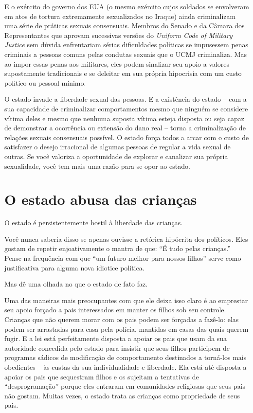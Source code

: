 E o exército do governo dos EUA (o mesmo exército cujos soldados se envolveram em atos de tortura extremamente sexualizados no Iraque) ainda criminalizam uma série de práticas sexuais consensuais. Membros do Senado e da Câmara dos Representantes que aprovam sucessivas versões do \emph{Uniform Code of Military Justice} sem dúvida enfrentariam sérias dificuldades políticas se impusessem penas criminais a pessoas comuns pelas condutas sexuais que o UCMJ criminaliza. Mas ao impor essas penas aos militares, eles podem sinalizar seu apoio a valores supostamente tradicionais e se deleitar em sua própria hipocrisia com um custo político ou pessoal mínimo.

O estado invade a liberdade sexual das pessoas. E a existência do estado -- com a sua capacidade de criminalizar comportamentos mesmo que ninguém se considere vítima deles e mesmo que nenhuma suposta vítima esteja disposta ou seja capaz de demonstrar a ocorrência ou extensão do dano real -- torna a criminalização de relações sexuais consensuais possível. O estado força todos a arcar com o custo de satisfazer o desejo irracional de algumas pessoas de regular a vida sexual de outras. Se você valoriza a oportunidade de explorar e canalizar sua própria sexualidade, você tem mais uma razão para se opor ao estado.

\section{O estado abusa das crianças}

O estado é persistentemente hostil à liberdade das crianças.

Você nunca saberia disso se apenas ouvisse a retórica hipócrita dos políticos. Eles gostam de repetir enjoativamente o mantra de que: ``É tudo pelas crianças.'' Pense na frequência com que ``um futuro melhor para nossos filhos'' serve como justificativa para alguma nova idiotice política.

Mas dê uma olhada no que o estado de fato faz.

Uma das maneiras mais preocupantes com que ele deixa isso claro é ao emprestar seu apoio forçado a pais interessados em manter os filhos sob seu controle. Crianças que não querem morar com os pais podem ser forçadas a fazê-lo: elas podem ser arrastadas para casa pela polícia, mantidas em casas das quais querem fugir. E a lei está perfeitamente disposta a apoiar os pais que usam da sua autoridade concedida pelo estado para insistir que seus filhos participem de programas sádicos de modificação de comportamento destinados a torná-los mais obedientes -- às custas da sua individualidade e liberdade. Ela está até disposta a apoiar os pais que sequestram filhos e os sujeitam a tentativas de ``desprogramação'' porque eles entraram em comunidades religiosas que seus pais não gostam. Muitas vezes, o estado trata as crianças como propriedade de seus pais.

